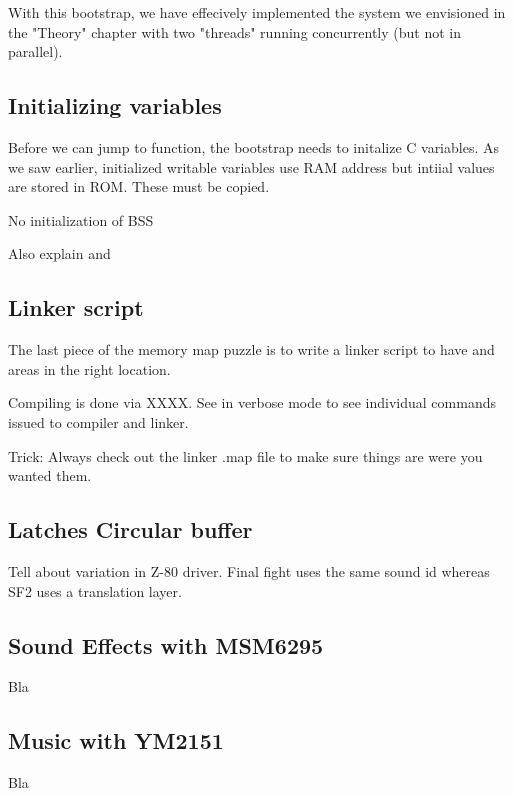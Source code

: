 With this bootstrap, we have effecively implemented the system we envisioned in the "Theory" chapter with two "threads" running concurrently (but not in parallel).

\subsection{Initializing variables}
Before we can jump to  function, the bootstrap needs to initalize C variables. As we saw earlier, initialized writable variables use RAM address but intiial values are stored in ROM. These must be copied.




 

No initialization of BSS

Also explain  and 

\subsection{Linker script}

The last piece of the memory map puzzle is to write a linker script to have  and  areas in the right location.



Compiling is done via XXXX. See  in verbose mode to see individual commands issued to  compiler and  linker.

Trick: Always check out the linker .map file to make sure things are were you wanted them.

\subsection{Latches Circular buffer}

Tell about variation in Z-80 driver. Final fight uses the same sound id whereas SF2 uses a translation layer.


\subsection{Sound Effects with MSM6295}
Bla

\subsection{Music with YM2151}
Bla
